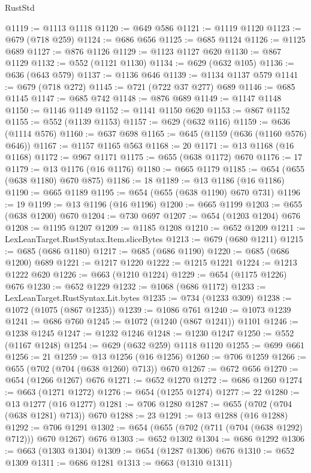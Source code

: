 \begin{lexlean}{RustStd}
\begin{coremodule}
@1119 := @1113 @1118
@1120 := @649 @586
@1121 := @1119 @1120
@1123 := @679 (@718 @259)
@1124 := @686 @656
@1125 := @685 @1124
@1126 := @1125 @689
@1127 := @876 @1126
@1129 := @1123 @1127 @620
@1130 := @867 @1129
@1132 := @552 (@1121 @1130)
@1134 := @629 (@632 @105)
@1136 := @636 (@643 @579)
@1137 := @1136 @646
@1139 := @1134 @1137 @579
@1141 := @679 (@718 @272)
@1145 := @721 (@722 @37 @277) @689
@1146 := @685 @1145
@1147 := @685 @742
@1148 := @876 @689
@1149 := @1147 @1148
@1150 := @1146 @1149
@1152 := @1141 @1150 @620
@1153 := @867 @1152
@1155 := @552 (@1139 @1153)
@1157 := @629 (@632 @116)
@1159 := @636 (@1114 @576)
@1160 := @637 @698
@1165 := @645 (@1159 (@636 (@1160 @576) @646))
@1167 := @1157 @1165 @563
@1168 := 20
@1171 := @13 @1168 (@16 @1168)
@1172 := @967 @1171
@1175 := @655 (@638 @1172) @670
@1176 := 17
@1179 := @13 @1176 (@16 @1176)
@1180 := @665 @1179
@1185 := @654 (@655 (@638 @1180) @670 @875)
@1186 := 18
@1189 := @13 @1186 (@16 @1186)
@1190 := @665 @1189
@1195 := @654 (@655 (@638 @1190) @670 @731)
@1196 := 19
@1199 := @13 @1196 (@16 @1196)
@1200 := @665 @1199
@1203 := @655 (@638 @1200) @670
@1204 := @730 @697
@1207 := @654 (@1203 @1204) @676
@1208 := @1195 @1207
@1209 := @1185 @1208
@1210 := @652 @1209
@1211 := LexLeanTarget.RustSyntax.Item.sliceBytes
@1213 := @679 (@680 @1211)
@1215 := @685 (@686 @1180)
@1217 := @685 (@686 @1190)
@1220 := @685 (@686 @1200) @689
@1221 := @1217 @1220
@1222 := @1215 @1221
@1224 := @1213 @1222 @620
@1226 := @663 (@1210 @1224)
@1229 := @654 (@1175 @1226) @676
@1230 := @652 @1229
@1232 := @1068 (@686 @1172)
@1233 := LexLeanTarget.RustSyntax.Lit.bytes
@1235 := @734 (@1233 @309)
@1238 := @1072 (@1075 (@867 @1235))
@1239 := @1086 @761
@1240 := @1073 @1239
@1241 := @686 @760
@1245 := @1072 (@1240 (@867 @1241)) @1101
@1246 := @1238 @1245
@1247 := @1232 @1246
@1248 := @1230 @1247
@1250 := @552 (@1167 @1248)
@1254 := @629 (@632 @259) @1118 @1120
@1255 := @699 @661
@1256 := 21
@1259 := @13 @1256 (@16 @1256)
@1260 := @706 @1259
@1266 := @655 (@702 (@704 (@638 @1260) @713)) @670
@1267 := @672 @656
@1270 := @654 (@1266 @1267) @676
@1271 := @652 @1270
@1272 := @686 @1260
@1274 := @663 (@1271 @1272)
@1276 := @654 (@1255 @1274)
@1277 := 22
@1280 := @13 @1277 (@16 @1277)
@1281 := @706 @1280
@1287 := @655 (@702 (@704 (@638 @1281) @713)) @670
@1288 := 23
@1291 := @13 @1288 (@16 @1288)
@1292 := @706 @1291
@1302 := @654 (@655 (@702 (@711 (@704 (@638 @1292) @712))) @670 @1267) @676
@1303 := @652 @1302
@1304 := @686 @1292
@1306 := @663 (@1303 @1304)
@1309 := @654 (@1287 @1306) @676
@1310 := @652 @1309
@1311 := @686 @1281
@1313 := @663 (@1310 @1311)

\end{coremodule}
\end{lexlean}
